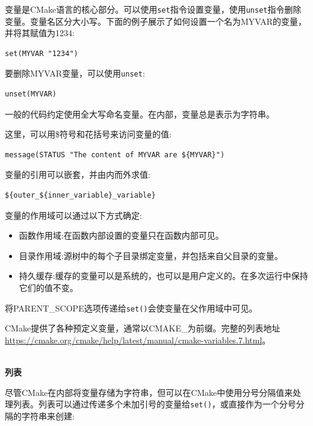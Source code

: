 变量是CMake语言的核心部分。可以使用\texttt{set}指令设置变量，使用\texttt{unset}指令删除变量。变量名区分大小写。下面的例子展示了如何设置一个名为MYVAR的变量，并将其赋值为1234:

\begin{lstlisting}[style=styleCMake]
set(MYVAR "1234")
\end{lstlisting}

要删除MYVAR变量，可以使用\texttt{unset}:

\begin{lstlisting}[style=styleCMake]
unset(MYVAR)
\end{lstlisting}

一般的代码约定使用全大写命名变量。在内部，变量总是表示为字符串。

这里，可以用\$符号和花括号来访问变量的值:

\begin{lstlisting}[style=styleCMake]
message(STATUS "The content of MYVAR are ${MYVAR}")
\end{lstlisting}

变量的引用可以嵌套，并由内而外求值:

\begin{lstlisting}[style=styleCMake]
${outer_${inner_variable}_variable}
\end{lstlisting}

变量的作用域可以通过以下方式确定:

\begin{itemize}
\item 
函数作用域:在函数内部设置的变量只在函数内部可见。

\item 
目录作用域:源树中的每个子目录绑定变量，并包括来自父目录的变量。

\item 
持久缓存:缓存的变量可以是系统的，也可以是用户定义的。在多次运行中保持它们的值不变。
\end{itemize}

将PARENT\_SCOPE选项传递给\texttt{set()}会使变量在父作用域中可见。

CMake提供了各种预定义变量，通常以CMAKE\_为前缀。完整的列表地址\url{https://cmake.org/cmake/help/latest/manual/cmake-variables.7.html}。

\hspace*{\fill} \\ %
\noindent
\textbf{列表}

尽管CMake在内部将变量存储为字符串，但可以在CMake中使用分号分隔值来处理列表。列表可以通过传递多个未加引号的变量给\texttt{set()}，或直接作为一个分号分隔的字符串来创建:

